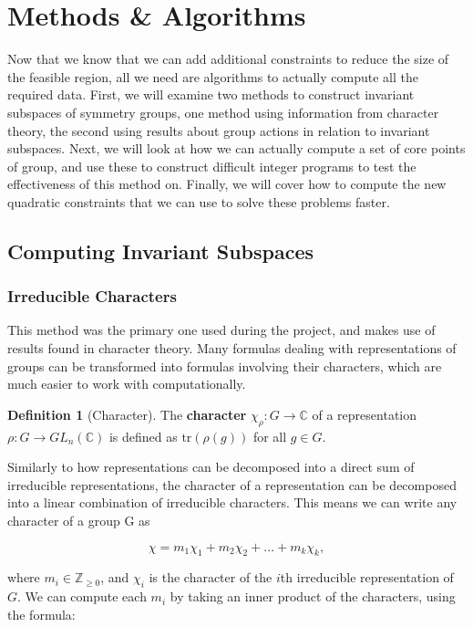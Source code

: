 \documentclass[11pt]{article} %
\theoremstyle{definition}
\newtheorem{definition}[theorem]{Definition}
\theoremstyle{remark}
\begin{document}
\section{Methods \& Algorithms}

Now that we know that we can add additional constraints to reduce the size of the feasible region, all we need are algorithms to actually compute all the required data. First, we will examine two methods to construct invariant subspaces of symmetry groups, one method using information from character theory, the second using results about group actions in relation to invariant subspaces. Next, we will look at how we can actually compute a set of core points of group, and use these to construct difficult integer programs to test the effectiveness of this method on. Finally, we will cover how to compute the new quadratic constraints that we can use to solve these problems faster.

\subsection{Computing Invariant Subspaces}

\subsubsection{Irreducible Characters} \label{charmethod}

This method was the primary one used during the project, and makes use of results found in character theory. Many formulas dealing with representations of groups can be transformed into formulas involving their characters, which are much easier to work with computationally.

\begin{definition}[Character] 
The \textbf{character} $\chi_\rho : G \rightarrow \mathbb{C}$ of a representation $\rho : G \rightarrow GL_n(\mathbb{C})$ is defined as $\textrm{tr}(\rho(g))$ for all $g \in G$.
\end{definition}

Similarly to how representations can be decomposed into a direct sum of irreducible representations, the character of a representation can be decomposed into a linear combination of irreducible characters. This means we can write any character of a group G as

	$$ \chi = m_1\chi_1 + m_2\chi_2 + ... + m_k\chi_k, $$

where $m_i \in \mathbb{Z}_{\geq 0}$, and $\chi_i$ is the character of the $i$th irreducible representation of $G$. We can compute each $m_i$ by taking an inner product of the characters, using the formula:
\end{document}
